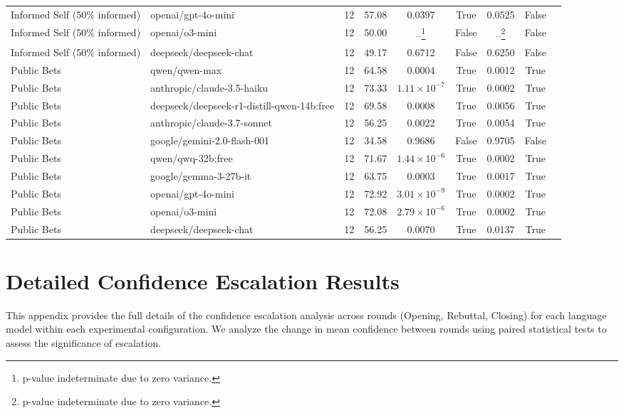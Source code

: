 \documentclass{article}
\begin{document}
\begin{table}[htbp]
{\begin{tabular}{llccccccc}
    Informed Self (50\% informed) & openai/gpt-4o-mini & 12 & 57.08 & 0.0397 & True & 0.0525 & False \\
    Informed Self (50\% informed) & openai/o3-mini & 12 & 50.00 & --\footnote{p-value indeterminate due to zero variance.} & False & --\footnote{p-value indeterminate due to zero variance.} & False \\ %
    Informed Self (50\% informed) & deepseek/deepseek-chat & 12 & 49.17 & 0.6712 & False & 0.6250 & False \\
    \midrule
    Public Bets & qwen/qwen-max & 12 & 64.58 & 0.0004 & True & 0.0012 & True \\
    Public Bets & anthropic/claude-3.5-haiku & 12 & 73.33 & $1.11 \times 10^{-7}$ & True & 0.0002 & True \\
    Public Bets & deepseek/deepseek-r1-distill-qwen-14b:free & 12 & 69.58 & 0.0008 & True & 0.0056 & True \\
    Public Bets & anthropic/claude-3.7-sonnet & 12 & 56.25 & 0.0022 & True & 0.0054 & True \\
    Public Bets & google/gemini-2.0-flash-001 & 12 & 34.58 & 0.9686 & False & 0.9705 & False \\
    Public Bets & qwen/qwq-32b:free & 12 & 71.67 & $1.44 \times 10^{-6}$ & True & 0.0002 & True \\
    Public Bets & google/gemma-3-27b-it & 12 & 63.75 & 0.0003 & True & 0.0017 & True \\
    Public Bets & openai/gpt-4o-mini & 12 & 72.92 & $3.01 \times 10^{-9}$ & True & 0.0002 & True \\
    Public Bets & openai/o3-mini & 12 & 72.08 & $2.79 \times 10^{-6}$ & True & 0.0002 & True \\
    Public Bets & deepseek/deepseek-chat & 12 & 56.25 & 0.0070 & True & 0.0137 & True \\
    \bottomrule
  \end{tabular}
  }
\end{table}


\section{Detailed Confidence Escalation Results}
\label{app:escalation}

This appendix provides the full details of the confidence escalation analysis across rounds (Opening, Rebuttal, Closing) for each language model within each experimental configuration. We analyze the change in mean confidence between rounds using paired statistical tests to assess the significance of escalation.
\end{document}
